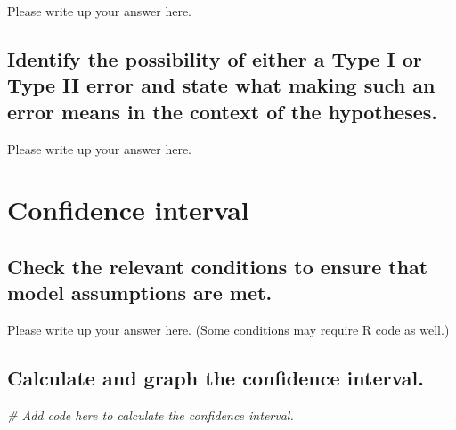 \documentclass[
]{book}
\newenvironment{Shaded}{\begin{snugshade}}{\end{snugshade}}
\newcommand{\CommentTok}[1]{\textcolor[rgb]{0.56,0.35,0.01}{\textit{#1}}}
\begin{document}
Please write up your answer here.

\hypertarget{identify-the-possibility-of-either-a-type-i-or-type-ii-error-and-state-what-making-such-an-error-means-in-the-context-of-the-hypotheses.-2}{%
\subsection*{Identify the possibility of either a Type I or Type II error and state what making such an error means in the context of the hypotheses.}\label{identify-the-possibility-of-either-a-type-i-or-type-ii-error-and-state-what-making-such-an-error-means-in-the-context-of-the-hypotheses.-2}}

Please write up your answer here.

\hypertarget{confidence-interval}{%
\section*{Confidence interval}\label{confidence-interval}}

\hypertarget{check-the-relevant-conditions-to-ensure-that-model-assumptions-are-met.-4}{%
\subsection*{Check the relevant conditions to ensure that model assumptions are met.}\label{check-the-relevant-conditions-to-ensure-that-model-assumptions-are-met.-4}}

Please write up your answer here. (Some conditions may require R code as well.)

\hypertarget{calculate-and-graph-the-confidence-interval.}{%
\subsection*{Calculate and graph the confidence interval.}\label{calculate-and-graph-the-confidence-interval.}}

\begin{Shaded}
\begin{Highlighting}[]
\CommentTok{\# Add code here to calculate the confidence interval.}
\end{Highlighting}
\end{Shaded}
\end{document}
